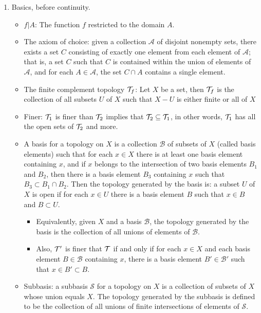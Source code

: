 \documentclass[12pt,letterpaper]{article}
\begin{document}
\begin{enumerate}
  \item \label{sec:EarlyChapters} Basics, before continuity. \begin{itemize}
    \item \label{dfn:functionRestriction} $f|A$: The function $f$ restricted to the domain $A$.
    \item \label{thm:AxiomChoice} The axiom of choice: given a collection $\mathcal{A}$ of disjoint nonempty sets, there exists a set $C$ consisting of exactly one element from each element of $\mathcal{A}$; that is, a set $C$ such that $C$ is contained within the union of elements of $\mathcal{A}$, and for each $A\in\mathcal{A}$, the set $C\cap A$ contains a single element.
    \item \label{dfn:finiteComplementTopology} The finite complement topology $\mathcal{T}_f$: Let $X$ be a set, then $\mathcal{T}_f$ is the collection of all subsets $U$ of $X$ such that $X-U$ is either finite or all of $X$
    \item \label{dfn:finer} Finer: $\mathcal{T}_1$ is finer than $\mathcal{T}_2$ implies that $\mathcal{T}_2\subseteq \mathcal{T}_1$, in other words, $\mathcal{T}_1$ has all the open sets of $\mathcal{T}_2$ and more.
    \item \label{dfn:basis} A basis for a topology on $X$ is a collection $\mathcal{B}$ of subsets of $X$ (called basis elements) such that for each $x\in X$ there is at least one basis element containing $x$, and if $x$ belongs to the intersection of two basis elements $B_1$ and $B_2$, then there is a basis element $B_3$ containing $x$ such that $B_3 \subset B_1 \cap B_2$. Then the topology generated by the basis is: a subset $U$ of $X$ is open if for each $x\in U$ there is a basis element $B$ such that $x\in B$ and $B\subset U$.
    \begin{itemize}
      \item \label{thm:basisUnion} Equivalently, given $X$ and a basis $\mathcal{B}$, the topology generated by the basis is the collection of all unions of elements of $\mathcal{B}$.
      \item \label{thm:basisFiner} Also, $\mathcal{T}'$ is finer that $\mathcal{T}$ if and only if for each $x\in X$ and each basis element $B\in\mathcal{B}$ containing $x$, there is a basis element $B'\in \mathcal{B}'$ such that $x\in B'\subset B$.
    \end{itemize}
    \item \label{dfn:subbasis} Subbasis: a subbasis $\mathcal{S}$ for a topology on $X$ is a collection of subsets of $X$ whose union equals $X$. The topology generated by the subbasis is defined to be the collection of all unions of finite intersections of elements of $\mathcal{S}$.

\end{itemize}
\end{enumerate}
\end{document}

